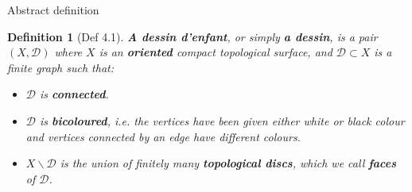 \documentclass[pdf]{beamer}
\numberwithin{equation}{section}
\theoremstyle{plain}
\newtheorem{defn}[theorem]{Definition}
\theoremstyle{plain}
\theoremstyle{remark}
\begin{document}
\begin{frame}{Abstract definition}
	\begin{defn}[Def 4.1]
		\textbf{A dessin d'enfant}, or simply \textbf{a dessin}, is a pair
		$(X, \mathcal{D})$ where $X$ is an \textbf{oriented} compact topological surface, and
		$\mathcal{D} \subset X$ is a finite graph such that: 
		\begin{itemize}
			\item  $\mathcal{D}$ is \textbf{connected}.
			\item  $\mathcal{D}$ is \textbf{bicoloured}, i.e. the vertices have been given either white or black colour and vertices connected by an edge have different colours.
			\item  $X \smallsetminus \mathcal{D}$ is the union of finitely many \textbf{topological discs}, which we call \textbf{faces} of  $\mathcal{D}$.
		\end{itemize}
	\end{defn}
\end{frame}
\end{document}
